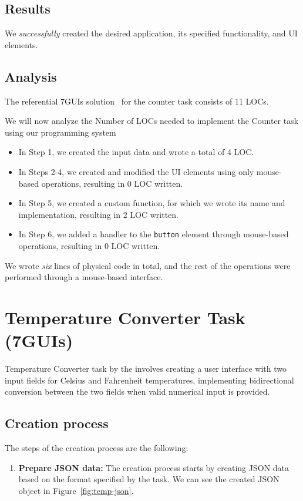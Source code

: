 \subsection{Results}
We \emph{successfully} created the desired application, its specified functionality, and UI elements.

\subsection{Analysis}
The referential 7GUIs solution~\cite{7guis-React-TypeScript-MobX/src/app/guis/counter.tsx} for the counter task consists of 11 LOCs.

We will now analyze the Number of LOCs needed to implement the Counter task using our programming system
\begin{itemize}
	\item In Step 1, we created the input data and wrote a total of 4 LOC.
	\item   In Steps 2-4, we created and modified the UI elements using only mouse-based operations, resulting in 0 LOC written.
	\item   In Step 5, we created a custom function, for which we wrote its name and implementation, resulting in 2 LOC written.
	\item   In Step 6, we added a handler to the \texttt{button} element through mouse-based operations, resulting in 0 LOC written.
\end{itemize}
We wrote \emph{six} lines of physical code in total, and the rest of the operations were performed through a mouse-based interface.




\section{Temperature Converter Task (7GUIs)}
Temperature Converter task by the \citet{7GUIs-web} involves creating a user interface with two input fields for Celsius and Fahrenheit temperatures,
implementing bidirectional conversion between the two fields when valid numerical input is provided.

\subsection {Creation process}

The steps of the creation process are the following:
\begin{enumerate}
	\item \textbf{Prepare JSON data:} The creation process starts by creating JSON data based on the format specified by the task.
	      We can see the created JSON object in Figure~\ref{fig:temp-json}.

\end{enumerate}


